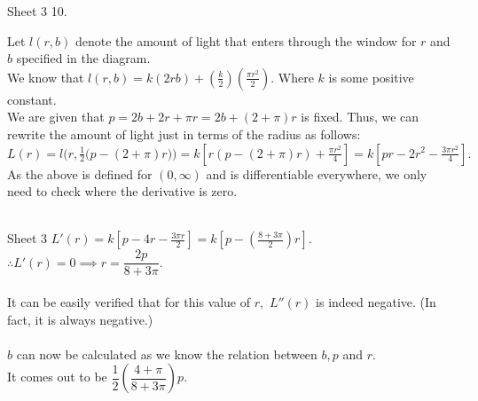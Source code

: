 \documentclass[handout, aspectratio=169]{beamer}
\begin{document}
\begin{frame}{Sheet 3}
	10.
	\begin{figure}
		\centering
	\end{figure}
	Let $l(r, b)$ denote the amount of light that enters through the window for $r$ and $b$ specified in the diagram.\\
	We know that $l(r, b) = k(2rb) + \left(\frac{k}{2}\right)(\frac{\pi r^2}{2}).$ Where $k$ is some positive constant.\\
	
	We are given that $p = 2b + 2r + \pi r = 2b + (2 + \pi)r$ is fixed. Thus, we can rewrite the amount of light just in terms of the radius as follows:\\
	$L(r) = l\bigg(r, \frac{1}{2}\big(p - (2 + \pi)r\big)\bigg) = k\left[r(p - (2 + \pi)r) + \frac{\pi r^2}{4}\right] = k \left[pr - 2r^2 - \frac{3\pi r^2}{4}\right].$\\
	As the above is defined for $(0, \infty)$ and is differentiable everywhere, we only need to check where the derivative is zero.\\~\\
\end{frame}
\begin{frame}{Sheet 3}
	$L'(r) = k\left[p - 4r - \frac{3\pi r}{2}\right] = k\left[p - \left(\frac{8 + 3\pi}{2}\right)r\right] .$\\
	$\therefore L'(r) = 0 \implies r = \dfrac{2p}{8 + 3\pi}.$\\~\\
	It can be easily verified that for this value of $r,$ $L''(r)$ is indeed negative. (In fact, it is always negative.)\\~\\
	$b$ can now be calculated as we know the relation between $b, p$ and $r.$\\
	It comes out to be $\dfrac{1}{2}\left(\dfrac{4 + \pi}{8 + 3\pi}\right)p.$
\end{frame}
\end{document}
